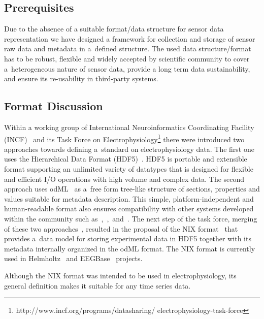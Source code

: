 \documentclass[a4paper,twoside]{article}
\begin{document}
\subsection{Prerequisites}\label{sec:requirements}

Due to the absence of a suitable format/data structure for sensor data representation we have designed a framework for collection and storage of sensor raw data and metadata in a~defined structure. The used data structure/format has to be robust, flexible and widely accepted by scientific community to cover a~heterogeneous nature of sensor data, provide a long term data sustainability, and ensure its re-usability in third-party systems.

\subsection{Format Discussion}

Within a working group of International Neuroinformatics Coordinating Facility (INCF)~\cite{wvangeit:Bjaalie:JNeurosci:2007} and its Task Force on Electrophysiology\footnote{http://www.incf.org/programs/datasharing/ electrophysiology-task-force} there were introduced two approaches towards defining a~standard on electrophysiology data. The first one uses the Hierarchical Data Format (HDF5)~\cite{hdf5}. HDF5 is portable and extensible format supporting an unlimited variety of datatypes that is designed for flexible and efficient I/O operations with high volume and complex data. The second approach uses odML~\cite{10.3389/fninf.2011.00016} as a~free form tree-like structure of sections, properties and values suitable for metadata description. This simple, platform-independent and human-readable format also ensures compatibility with other systems developed within the community such as~\cite{10.3389/conf.fninf.2014.18.00029},~\cite{10.3389/conf.fninf.2014.18.00053},~and~\cite{10.3389/conf.fninf.2013.09.00025}. The next step of the task force, merging of these two approaches~\cite{10.3389/conf.fninf.2013.09.00069}, resulted in the proposal of the NIX format~\cite{Stoewer:2014} that provides a~data model for storing experimental data in HDF5 together with its metadata internally organized in the odML format. The NIX format is currently used in Helmholtz~\cite{10.3389/conf.fninf.2013.09.00025} and EEGBase~\cite{ISI:000306821100004} projects.

Although the NIX format was intended to be used in electrophysiology, its general definition makes it suitable for any time series data.
\end{document}
